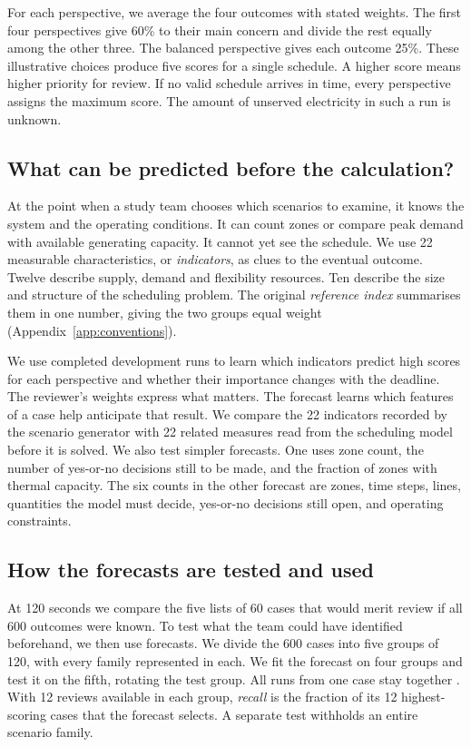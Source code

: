 \documentclass[11pt,a4paper]{article}
\begin{document}
For each perspective, we average the four outcomes with stated weights. The first four perspectives give 60\% to their main concern and divide the rest equally among the other three. The balanced perspective gives each outcome 25\%. These illustrative choices produce five scores for a single schedule. A higher score means higher priority for review. If no valid schedule arrives in time, every perspective assigns the maximum score. The amount of unserved electricity in such a run is unknown.

\subsection{What can be predicted before the calculation?}
\label{sec:indicators}

At the point when a study team chooses which scenarios to examine, it knows the system and the operating conditions. It can count zones or compare peak demand with available generating capacity. It cannot yet see the schedule. We use 22 measurable characteristics, or \emph{indicators}, as clues to the eventual outcome. Twelve describe supply, demand and flexibility resources. Ten describe the size and structure of the scheduling problem. The original \emph{reference index} summarises them in one number, giving the two groups equal weight (Appendix~\ref{app:conventions}).

We use completed development runs to learn which indicators predict high scores for each perspective and whether their importance changes with the deadline. The reviewer's weights express what matters. The forecast learns which features of a case help anticipate that result. We compare the 22 indicators recorded by the scenario generator with 22 related measures read from the scheduling model before it is solved. We also test simpler forecasts. One uses zone count, the number of yes-or-no decisions still to be made, and the fraction of zones with thermal capacity. The six counts in the other forecast are zones, time steps, lines, quantities the model must decide, yes-or-no decisions still open, and operating constraints.

\subsection{How the forecasts are tested and used}
\label{sec:protocol}

At 120 seconds we compare the five lists of 60 cases that would merit review if all 600 outcomes were known. To test what the team could have identified beforehand, we then use forecasts. We divide the 600 cases into five groups of 120, with every family represented in each. We fit the forecast on four groups and test it on the fifth, rotating the test group. All runs from one case stay together \citep{cawley2010,roberts2017}. With 12 reviews available in each group, \emph{recall} is the fraction of its 12 highest-scoring cases that the forecast selects. A separate test withholds an entire scenario family.
\end{document}
